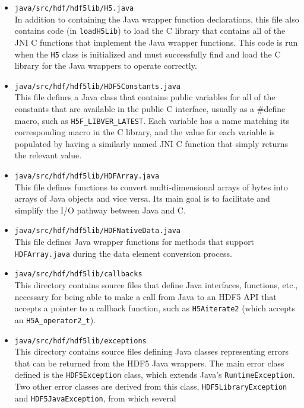 \begin{itemize}
  \item \texttt{java/src/hdf/hdf5lib/H5.java} \\
    In addition to containing the Java wrapper function declarations, this file also contains
    code (in \texttt{loadH5Lib}) to load the C library that contains all of the JNI C functions
    that implement the Java wrapper functions. This code is run when the \texttt{H5} class is
    initialized and must successfully find and load the C library for the Java wrappers to
    operate correctly.
  \item \texttt{java/src/hdf/hdf5lib/HDF5Constants.java} \\
    This file defines a Java class that contains public variables for all of the constants that
    are available in the public C interface, usually as a \#define macro, such as
    \texttt{H5F\_LIBVER\_LATEST}. Each variable has a name matching its corresponding macro in
    the C library, and the value for each variable is populated by having a similarly named
    JNI C function that simply returns the relevant value.
  \item \texttt{java/src/hdf/hdf5lib/HDFArray.java} \\
    This file defines functions to convert multi-dimensional arrays of bytes into
    arrays of Java objects and vice versa. Its main goal is to facilitate and simplify the
    I/O pathway between Java and C.
  \item \texttt{java/src/hdf/hdf5lib/HDFNativeData.java} \\
    This file defines Java wrapper functions for methods that support \texttt{HDFArray.java}
    during the data element conversion process.
  \item \texttt{java/src/hdf/hdf5lib/callbacks} \\
    This directory contains source files that define Java interfaces, functions, etc., necessary
    for being able to make a call from Java to an HDF5 API that accepts a pointer to a callback
    function, such as \texttt{H5Aiterate2} (which accepts an \texttt{H5A\_operator2\_t}).
  \item \texttt{java/src/hdf/hdf5lib/exceptions} \\
    This directory contains source files defining Java classes representing errors that
    can be returned from the HDF5 Java wrappers. The main error class defined is the \texttt{HDF5Exception}
    class, which extends Java's \texttt{RuntimeException}. Two other
    error classes are derived from this class, \texttt{HDF5LibraryException} and \texttt{HDF5JavaException}, from which several

\end{itemize}
